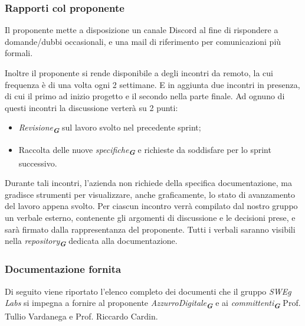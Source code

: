 \subsubsection{Rapporti col proponente}
Il proponente mette a disposizione un canale Discord al fine di rispondere a domande/dubbi occasionali, e una mail di riferimento per comunicazioni più formali.

Inoltre il proponente si rende disponibile a degli incontri da remoto, la cui frequenza è di una volta ogni 2 settimane.
E in aggiunta due incontri in presenza, di cui il primo ad inizio progetto e il secondo nella parte finale.
Ad ognuno di questi incontri la discussione verterà su 2 punti:
\begin{itemize}
    \item \emph{Revisione}\textsubscript{\textit{\textbf{G}}} sul lavoro svolto nel precedente sprint;
    \item Raccolta delle nuove \emph{specifiche}\textsubscript{\textit{\textbf{G}}} e richieste da soddisfare per lo sprint successivo.
\end{itemize}
Durante tali incontri, l’azienda non richiede della specifica documentazione, ma gradisce strumenti per visualizzare, anche graficamente, lo stato di avanzamento del lavoro appena svolto.
Per ciascun incontro verrà compilato dal nostro gruppo un verbale esterno, contenente gli argomenti di discussione e le decisioni prese, e sarà firmato dalla rappresentanza del proponente.
Tutti i verbali saranno visibili nella \emph{repository}\textsubscript{\textit{\textbf{G}}} dedicata alla documentazione.

\subsubsection{Documentazione fornita}
\label{sec:documentazione_fornita}
Di seguito viene riportato l'elenco completo dei documenti che il gruppo \emph{SWEg Labs} si impegna a fornire al proponente \emph{AzzurroDigitale}\textsubscript{\textit{\textbf{G}}}
e ai \emph{committenti}\textsubscript{\textit{\textbf{G}}} Prof. Tullio Vardanega e Prof. Riccardo Cardin.

